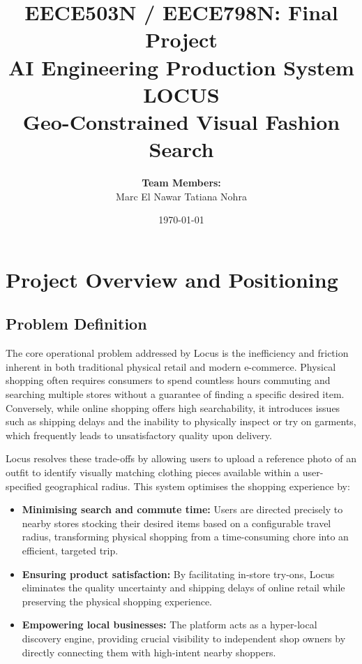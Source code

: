 \documentclass[12pt]{article}
\title{
    \textbf{EECE503N / EECE798N: Final Project}\\
    \large AI Engineering Production System\\
    \vspace{0.5cm}
    {\huge\textbf{LOCUS}}\\
    \vspace{0.3cm}
    \large Geo-Constrained Visual Fashion Search
}
\author{
    \textbf{Team Members:}\\
    Marc El Nawar \quad Tatiana Nohra
}
\date{\today}
\begin{document}
\maketitle
\newpage

\tableofcontents
\newpage

\setcounter{page}{1}

\section{Project Overview and Positioning}

\subsection{Problem Definition}

The core operational problem addressed by Locus is the inefficiency and friction inherent in both traditional physical retail and modern e-commerce. Physical shopping often requires consumers to spend countless hours commuting and searching multiple stores without a guarantee of finding a specific desired item. Conversely, while online shopping offers high searchability, it introduces issues such as shipping delays and the inability to physically inspect or try on garments, which frequently leads to unsatisfactory quality upon delivery.

Locus resolves these trade-offs by allowing users to upload a reference photo of an outfit to identify visually matching clothing pieces available within a user-specified geographical radius. This system optimises the shopping experience by:

\begin{itemize}
  \item \textbf{Minimising search and commute time:} Users are directed precisely to nearby stores stocking their desired items based on a configurable travel radius, transforming physical shopping from a time-consuming chore into an efficient, targeted trip.
  \item \textbf{Ensuring product satisfaction:} By facilitating in-store try-ons, Locus eliminates the quality uncertainty and shipping delays of online retail while preserving the physical shopping experience.
  \item \textbf{Empowering local businesses:} The platform acts as a hyper-local discovery engine, providing crucial visibility to independent shop owners by directly connecting them with high-intent nearby shoppers.
\end{itemize}
\end{document}
